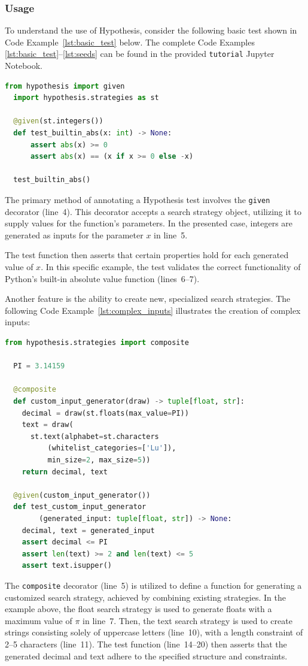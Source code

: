 \documentclass[runningheads]{llncs}
\begin{document}
\subsubsection{Usage}
To understand the use of Hypothesis, consider the following basic test shown in Code Example~\ref{lst:basic_test} below. The complete Code Examples \ref{lst:basic_test}--\ref{lst:seeds} can be found in the provided \texttt{tutorial} Jupyter Notebook.
\begin{lstlisting}[language=Python,caption={Basic Test from \texttt{tutorial.ipynb}},label=lst:basic_test]
  from hypothesis import given
  import hypothesis.strategies as st

  @given(st.integers())
  def test_builtin_abs(x: int) -> None:
      assert abs(x) >= 0
      assert abs(x) == (x if x >= 0 else -x)

  test_builtin_abs()
\end{lstlisting}
The primary method of annotating a Hypothesis test involves the \texttt{given} decorator (line~4). This decorator accepts a search strategy object, utilizing it to supply values for the function's parameters. In the presented case, integers are generated as inputs for the parameter $x$ in line~5.

The test function then asserts that certain properties hold for each generated value of $x$. In this specific example, the test validates the correct functionality of Python's built-in absolute value function (lines~6--7).

\vspace{5mm}
\noindent Another feature is the ability to create new, specialized search strategies. The following Code Example~\ref{lst:complex_inputs} illustrates the creation of complex inputs:

\begin{lstlisting}[language=Python,caption={Complex Inputs from \texttt{tutorial.ipynb}},label=lst:complex_inputs]
  from hypothesis.strategies import composite

  PI = 3.14159

  @composite
  def custom_input_generator(draw) -> tuple[float, str]:
    decimal = draw(st.floats(max_value=PI))
    text = draw(
      st.text(alphabet=st.characters
          (whitelist_categories=['Lu']),
          min_size=2, max_size=5))
    return decimal, text

  @given(custom_input_generator())
  def test_custom_input_generator
        (generated_input: tuple[float, str]) -> None:
    decimal, text = generated_input
    assert decimal <= PI
    assert len(text) >= 2 and len(text) <= 5
    assert text.isupper()
\end{lstlisting}
The \texttt{composite} decorator (line~5) is utilized to define a function for generating a customized search strategy, achieved by combining existing strategies. In the example above, the float search strategy is used to generate floats with a maximum value of $\pi$ in line~7. Then, the text search strategy is used to create strings consisting solely of uppercase letters (line~10), with a length constraint of 2--5 characters (line~11). The test function (line~14--20) then asserts that the generated decimal and text adhere to the specified structure and constraints.
\end{document}
